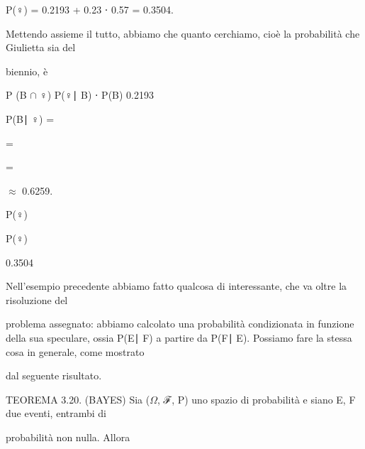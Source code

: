 \documentclass[a4paper,portrait,12pt]{article}
\begin{document}
\begin{flushleft}
P(♀) = 0.2193 + 0.23 ⋅ 0.57 = 0.3504.
\end{flushleft}


\begin{flushleft}
Mettendo assieme il tutto, abbiamo che quanto cerchiamo, cio\`{e} la probabilit\`{a} che Giulietta sia del
\end{flushleft}


\begin{flushleft}
biennio, \`{e}
\end{flushleft}


\begin{flushleft}
P (B $\cap$ ♀) P(♀∣ B) ⋅ P(B) 0.2193
\end{flushleft}


\begin{flushleft}
P(B∣ ♀) =
\end{flushleft}


=


=


$\approx$ 0.6259.


\begin{flushleft}
P(♀)
\end{flushleft}


\begin{flushleft}
P(♀)
\end{flushleft}


0.3504


\begin{flushleft}
Nell'esempio precedente abbiamo fatto qualcosa di interessante, che va oltre la risoluzione del
\end{flushleft}


\begin{flushleft}
problema assegnato: abbiamo calcolato una probabilit\`{a} condizionata in funzione della sua speculare, ossia P(E∣ F) a partire da P(F∣ E). Possiamo fare la stessa cosa in generale, come mostrato
\end{flushleft}


\begin{flushleft}
dal seguente risultato.
\end{flushleft}


\begin{flushleft}
TEOREMA 3.20. (BAYES) Sia ($\Omega$, ℱ, P) uno spazio di probabilit\`{a} e siano E, F due eventi, entrambi di
\end{flushleft}


\begin{flushleft}
probabilit\`{a} non nulla. Allora
\end{flushleft}
\end{document}
